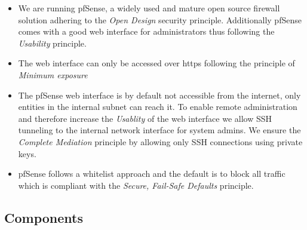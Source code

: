 \documentclass[english]{article}
\begin{document}
\begin{itemize}
    \item We are running pfSense, a widely used and mature open source firewall solution adhering to the \emph{Open Design} security principle. Additionally pfSense comes with a good web interface for administrators thus following the \emph{Usability} principle.
    \item The web interface can only be accessed over https following the principle of \emph{Minimum exposure}
    \item The pfSense web interface is by default not accessible from the internet, only entities in the internal subnet can reach it. To enable remote administration and therefore increase the \emph{Usablity} of the web interface we allow SSH tunneling to the internal network interface for system admins. We ensure the \emph{Complete Mediation} principle by allowing only SSH connections using private keys.
    \item pfSense follows a whitelist approach and the default is to block all traffic which is compliant with the \emph{Secure, Fail-Safe Defaults} principle.
\end{itemize}


\subsection{Components}

\end{document}
